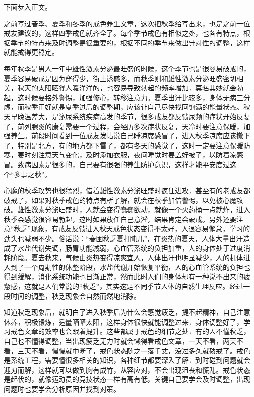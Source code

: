 下面步入正文。

之前写过春季、夏季和冬季的戒色养生文章，这次把秋季给写出来，也是之前一位戒友建议的，这样四季戒色就齐全了。每个季节戒色有相似之处，也各有特点，根据季节的特点来及时调整是很重要的，根据不同的季节来做出针对性的调整，这样就能戒得更稳定。

每年秋季是男人一年中雄性激素分泌最旺盛的时候，这个季节也是很容易破戒的，夏季容易破戒是因为穿得少，街上诱惑多，而秋季则和雄性激素分泌旺盛密切相关，秋天的太阳晒得人暖洋洋的，也容易导致勃起的频率增加，莫名其妙就会勃起，这时候要格外警惕，加强修心，转移注意力。夏季出汗比较多，身体无病三分虚，而秋季正好就是夏季过后的调整期，应该让自己尽快找回饱满的能量状态。秋天早晚温差大，是泌尿系统疾病高发的季节，很多戒友都反馈尿频的症状开始反复了，前列腺炎的康复需要一个过程，会经历多次症状反复，天冷时要注意保暖，加强养生。前段时间看到一位戒友发帖说自己睡凉席感冒了，进入秋季凉席应该撤下了，特别是北方，有的地方都下雪了，都有冬天的感觉了，这时一定要注意保暖防寒，要时刻注意天气变化，及时添加衣服，夜间睡觉时要盖好被子，以防着凉感冒。致病因素是很多的，自己要有很强的养生防护意识，这样才能平安度过这个“多事之秋”。

心魔的秋季攻势也很猛烈，借着雄性激素分泌旺盛时疯狂进攻，甚至有的老戒友都破戒了，如果对秋季戒色的特点有所了解，就会在秋季加倍警惕，以免被心魔攻破。雄性激素分泌旺盛时，人就会变得蠢蠢欲动，就像一个火药桶一点就炸，进入秋季会感觉很容易勃起，这时如果放任自己意淫，结果肯定会破戒。另外还要注意“秋乏”现象，有戒友反馈进入秋天戒色状态变得不太好，人很容易懈怠，学习的劲头也减弱不少。俗话说：“春困秋乏夏打盹儿”，在炎热的夏天，人体大量出汗造成了水盐代谢失调，肠胃功能减弱，心血管系统的负担加重，人的身体处于过度消耗阶段。夏去秋来，气候由炎热变得凉爽宜人，人体出汗也明显减少，人的机体进入到了一个周期性的休整阶段，水盐代谢开始恢复平衡，人的心血管系统的负担也得到缓解，消化系统功能也日渐正常，然而此时人们的身体却有一种说不出来的疲惫感，这就是人们常说的“秋乏”，其实这是不同季节人体的自然生理反应。经过一段时间的调整，秋乏现象会自然而然地消除。

知道秋乏现象后，就明白了进入秋季后为什么会感觉疲乏，提不起精神，自己注意休养，积极锻炼，适量晒晒太阳，这样身体很快就能调整过来，身体调整好了，学习戒色文章的效率也会跟着提升。这些都属于戒色的细节之处，有的人不懂秋乏，自己也不懂得调整，当出现疲乏无力时就会懒得看戒色文章，一天不看，两天不看，三天不看，慢慢就中断了，戒色状态随之一落千丈，没过多久就破戒了。戒色是系统工程，需要懂很多相关的知识，各种细节都要深入了解，到时碰到问题就会迎刃而解，这样就可以做到胸有成竹，从容应对，不会出现沮丧和慌乱。戒色状态是起伏的，就像运动员的竞技状态一样有高有低，关键自己要学会及时调整，出现问题时也要学会分析原因并找到对策。

